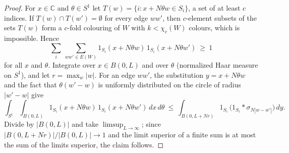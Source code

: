 \documentclass[11pt,a4paper]{amsart}
\theoremstyle{definition}
\theoremstyle{remark}
\newcommand{\C}{\mathbb{C}}
\begin{document}
\begin{proof}
For $x\in\C$ and $\theta\in S^1$ let $T(w)=\{i:x+N\theta w\in S_i\}$, a set of at least $c$ indices. If
$T(w)\cap T(w')=\emptyset$ for every edge $ww'$, then $c$-element subsets of the sets $T(w)$ form a $c$-fold
colouring of $W$ with $k<\chi_c(W)$ colours, which is impossible. Hence
\[
\sum_i\ \sum_{ww'\in E(W)}1_{S_i}(x+N\theta w)\,1_{S_i}(x+N\theta w')\ \ge\ 1
\]
for all $x$ and $\theta$. Integrate over $x\in B(0,L)$ and over $\theta$ (normalized Haar measure on $S^1$), and let
$r=\max_w|w|$. For an edge $ww'$, the substitution $y=x+N\theta w$ and the fact that $\theta(w'-w)$ is uniformly
distributed on the circle of radius $|w'-w|$ give
\[
\int_{S^1}\int_{B(0,L)}1_{S_i}(x+N\theta w)\,1_{S_i}(x+N\theta w')\,dx\,d\theta\ \le\
\int_{B(0,L+Nr)}1_{S_i}\,\bigl(1_{S_i}*\sigma_{N|w-w'|}\bigr)\,dy.
\]
Divide by $|B(0,L)|$ and take $\limsup_{L\to\infty}$; since $|B(0,L+Nr)|/|B(0,L)|\to1$ and the limit superior of a
finite sum is at most the sum of the limits superior, the claim follows.
\end{proof}
\end{document}
